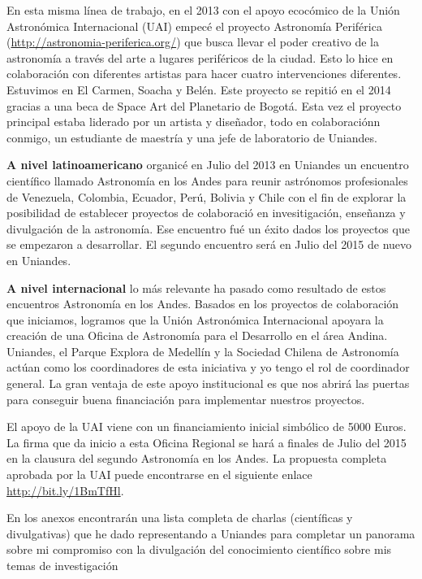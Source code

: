 \documentclass[letterpaper,12pt,onecolumn]{article}
\begin{document}
En esta misma l\'inea de trabajo, en el 2013 con el apoyo ecoc\'omico de la Uni\'on Astron\'omica Internacional (UAI) empec\'e el proyecto Astronom\'ia Perif\'erica (\url{http://astronomia-periferica.org/}) que busca
llevar el poder creativo de la astronom\'ia a trav\'es del arte a lugares
perif\'ericos de la ciudad. Esto lo hice en colaboraci\'on con diferentes
artistas para hacer cuatro intervenciones diferentes. Estuvimos en El
Carmen, Soacha y Bel\'en. Este proyecto se repiti\'o en el 2014 gracias a
una beca de Space Art del Planetario de Bogot\'a. Esta vez el proyecto
principal estaba liderado por un artista y dise\~nador, todo en
colaboraci\'onn conmigo,  un estudiante de maestr\'ia y una jefe de
laboratorio de Uniandes.

{\bf A nivel latinoamericano} organic\'e  en Julio del 2013 en Uniandes un encuentro
cient\'ifico llamado Astronom\'ia en los Andes para reunir astr\'onomos
profesionales de Venezuela, Colombia, Ecuador, Per\'u, Bolivia y Chile
con el fin de explorar la posibilidad de establecer proyectos de
colaboraci\'o  en invesitigaci\'on, ense\~nanza y divulgaci\'on de la
astronom\'ia. Ese encuentro fu\'e un \'exito dados los proyectos que
se empezaron a desarrollar. El segundo encuentro ser\'a en Julio del
2015 de nuevo en Uniandes. 

{\bf A nivel internacional} lo m\'as relevante ha pasado como resultado de estos
encuentros Astronom\'ia en los Andes. Basados en los proyectos de
colaboraci\'on que iniciamos, logramos que la Uni\'on Astron\'omica
Internacional apoyara la creaci\'on de una Oficina de Astronom\'ia
para el Desarrollo en el \'area Andina. Uniandes, el Parque Explora de
Medell\'in y la Sociedad Chilena de Astronom\'ia act\'uan como los
coordinadores de esta iniciativa y yo tengo el rol de coordinador
general. La gran ventaja de este apoyo institucional es que nos
abrir\'a las puertas para conseguir buena financiaci\'on para
implementar nuestros proyectos. 

El apoyo de la UAI viene con un financiamiento inicial simb\'olico de
5000 Euros. La firma que da inicio a esta Oficina Regional se har\'a a
finales de Julio del 2015 en la clausura del segundo Astronom\'ia en los Andes. 
La propuesta completa aprobada por la UAI puede encontrarse en el
siguiente enlace \url{http://bit.ly/1BmTfHl}.  
  
En los anexos encontrar\'an una lista completa de charlas
(cient\'ificas y divulgativas) que he dado representando a Uniandes para
completar un panorama sobre mi compromiso con la divulgaci\'on del
conocimiento cient\'ifico sobre mis temas de investigaci\'on  
\end{document}
